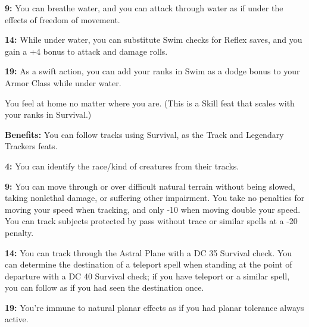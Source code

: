 \textbf{9:} You can breathe water, and you can attack through water as if under the effects of freedom of movement.

\textbf{14:} While under water, you can substitute Swim checks for Reflex saves, and you gain a +4 bonus to attack and damage rolls.

\textbf{19:} As a swift action, you can add your ranks in Swim as a dodge bonus to your Armor Class while under water.


You feel at home no matter where you are. (This is a Skill feat that scales with your ranks in Survival.)

\textbf{Benefits:} You can follow tracks using Survival, as the Track and Legendary Trackers feats.

\textbf{4:} You can identify the race/kind of creatures from their tracks.

\textbf{9:} You can move through or over difficult natural terrain without being slowed, taking nonlethal damage, or suffering other impairment. You take no penalties for moving your speed when tracking, and only -10 when moving double your speed. You can track subjects protected by pass without trace or similar spells at a -20 penalty.

\textbf{14:} You can track through the Astral Plane with a DC 35 Survival check. You can determine the destination of a teleport spell when standing at the point of departure with a DC 40 Survival check; if you have teleport or a similar spell, you can follow as if you had seen the destination once.

\textbf{19:} You're immune to natural planar effects as if you had planar tolerance always active.
